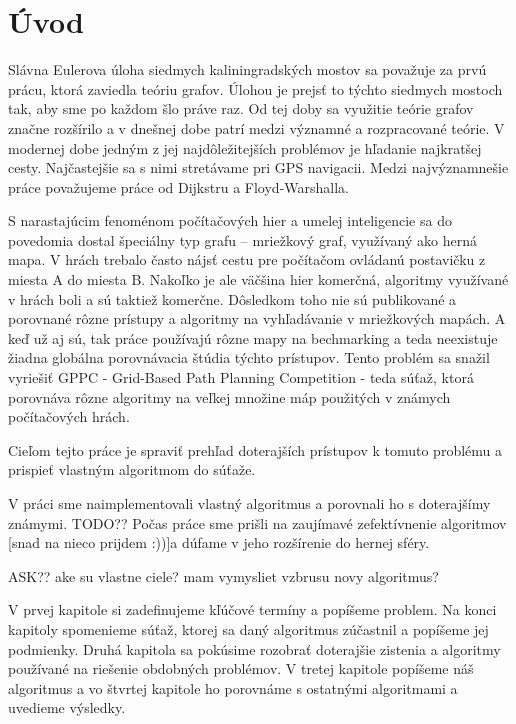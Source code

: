 \chapter*{Úvod}

Slávna Eulerova úloha siedmych kaliningradských mostov sa považuje za prvú prácu, 
ktorá zaviedla teóriu grafov. Úlohou je prejsť to týchto siedmych mostoch tak, aby sme po každom šlo práve raz.
Od tej doby sa využitie teórie grafov značne
rozšírilo a v dnešnej dobe patrí medzi významné
a rozpracované teórie. V modernej dobe jedným z jej 
najdôležitejších problémov je hľadanie najkratšej cesty. Najčastejšie sa s nimi stretávame pri 
GPS navigacii.
Medzi najvýznamnešie práce považujeme práce od Dijkstru a Floyd-Warshalla.

S narastajúcim fenoménom počítačových hier 
a umelej inteligencie sa do povedomia dostal špeciálny typ grafu --
mriežkový graf, využívaný ako herná mapa.
V hrách trebalo často nájsť cestu pre počítačom
ovládanú postavičku z miesta A do miesta B.
Nakoľko je ale väčšina hier komerčná, algoritmy
využívané v hrách boli a sú taktiež komerčne.
Dôsledkom toho nie sú publikované a porovnané rôzne prístupy a algoritmy
na vyhľadávanie v mriežkových mapách. A keď už aj sú, tak práce používajú rôzne mapy
na bechmarking a teda neexistuje žiadna globálna porovnávacia štúdia týchto prístupov.
Tento problém sa snažil vyriešiť GPPC - Grid-Based Path Planning Competition - teda súťaž, ktorá porovnáva rôzne algoritmy na veľkej množine máp
použitých v známych počítačových hrách.

Cieľom tejto práce je spraviť prehľad doterajších prístupov k tomuto problému a prispieť vlastným algoritmom
do súťaže.




V práci sme naimplementovali vlastný algoritmus a porovnali ho s doterajšímy známymi.
TODO?? Počas práce sme prišli na zaujímavé zefektívnenie algoritmov [snad na nieco prijdem :))]a dúfame v jeho rozšírenie do hernej sféry.

ASK?? ake su vlastne ciele? mam vymysliet vzbrusu novy algoritmus?

V prvej kapitole si zadefinujeme kľúčové termíny a popíšeme problem. Na konci kapitoly spomenieme súťaž, ktorej sa daný algoritmus zúčastnil 
a popíšeme jej podmienky.
Druhá kapitola sa pokúsime rozobrať doterajšie zistenia a algoritmy používané na riešenie obdobných problémov.
V tretej kapitole popíšeme náš algoritmus a vo štvrtej kapitole ho porovnáme s ostatnými algoritmami a uvedieme výsledky.
